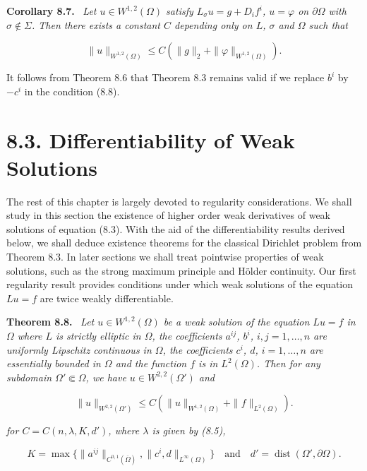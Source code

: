\medskip

\noindent\textbf{Corollary 8.7.} \
\emph{Let $u\in W^{1,2}(\Omega)$ satisfy $L_{\sigma}u=g+D_i f^i$, $u=\varphi$ on $\partial\Omega$ with $\sigma\notin\Sigma$.
Then there exists a constant $C$ depending only on $L$, $\sigma$ and $\Omega$ such that}

\begin{equation}
\tag{8.16}
\|u\|_{W^{1,2}(\Omega)}\le C(\|g\|_2+\|\varphi\|_{W^{1,2}(\Omega)}).
\end{equation}

It follows from Theorem 8.6 that Theorem 8.3 remains valid if we replace $b^i$ by $-c^i$ in the condition (8.8).

\bigskip

\section*{8.3. Differentiability of Weak Solutions}

The rest of this chapter is largely devoted to regularity considerations. We shall study in this section the existence of higher order weak derivatives of weak solutions of equation (8.3). With the aid of the differentiability results derived below, we shall deduce existence theorems for the classical Dirichlet problem from Theorem 8.3. In later sections we shall treat pointwise properties of weak solutions, such as the strong maximum principle and H\"older continuity. Our first regularity result provides conditions under which weak solutions of the equation $Lu=f$ are twice weakly differentiable.

\medskip

\noindent\textbf{Theorem 8.8.} \
\emph{Let $u\in W^{1,2}(\Omega)$ be a weak solution of the equation $Lu=f$ in $\Omega$ where $L$ is strictly elliptic in $\Omega$, the coefficients $a^{ij}$, $b^i$, $i, j=1,\ldots,n$ are uniformly Lipschitz continuous in $\Omega$, the coefficients $c^i$, $d$, $i=1,\ldots,n$ are essentially bounded in $\Omega$ and the function $f$ is in $L^2(\Omega)$. Then for any subdomain $\Omega'\Subset\Omega$, we have $u\in W^{2,2}(\Omega')$ and}

\begin{equation}
\tag{8.17}
\|u\|_{W^{2,2}(\Omega')}\le C(\|u\|_{W^{1,2}(\Omega)}+\|f\|_{L^2(\Omega)}).
\end{equation}

\emph{for $C=C(n,\lambda,K,d')$, where $\lambda$ is given by (8.5),}

\[
K=\max\{\|a^{ij}\|_{C^{0,1}(\overline\Omega)},\|c^i,d\|_{L^\infty(\Omega)}\}\quad \text{and}\quad d'=\operatorname{dist}(\Omega',\partial\Omega).
\]


